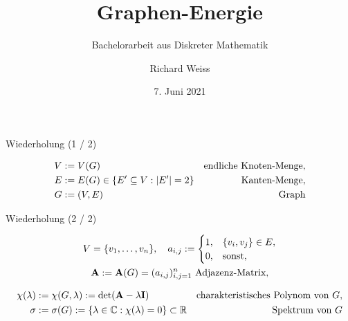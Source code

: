 \documentclass[aspectratio = 169]{beamer}
\title[Graphen-Energie]{Graphen-Energie}
\subtitle{Bachelorarbeit aus Diskreter Mathematik}
\author[R. Weiss]{Richard Weiss}
\institute[TU Wien]{TU Wien, Vienna, Austria}
\date{7. Juni 2021}
\begin{document}

\begin{frame}
    \titlepage
\end{frame}            


\begin{frame}{Wiederholung (1 / 2)}

    \begin{definition*}
    
        \begin{align*}
            V & := V(G)                                                    & \text{endliche Knoten-Menge}, \\
            E & := E(G) \in {\left \{ E^\prime \subseteq V: |E^\prime| = 2 \right \}} & \text{Kanten-Menge}, \\
            G & := (V, E)                                                  & \text{Graph}
        \end{align*}

    \end{definition*}    

\end{frame}


\begin{frame}{Wiederholung (2 / 2)}

    \begin{definition*}
    
        \begin{gather*}
            V = {\left \{ v_1, \dots, v_n \right \}},
            \quad
            a_{i, j}
            :=
            \begin{cases}
                1, & {\left \{ v_i, v_j \right \}} \in E, \\
                0, & \text{sonst},
            \end{cases} \\
            \mathbf A := \mathbf A(G) = (a_{i, j})_{i,j=1}^n ~\text{Adjazenz-Matrix},
        \end{gather*}
    
        \begin{align*}
            \chi(\lambda)
            & :=
            \chi(G, \lambda)
            :=
            \det(\mathbf A - \lambda \mathbf I)
            & \text{charakteristisches Polynom von $G$}, \\
            \sigma
            & :=
            \sigma(G)
            :=
            {\left \{ \lambda \in \mathbb C: \chi(\lambda) = 0 \right \}}
            \subset
            \mathbb R
            & \text{Spektrum von $G$}
        \end{align*}

    \end{definition*}    

\end{frame}
\end{document}
